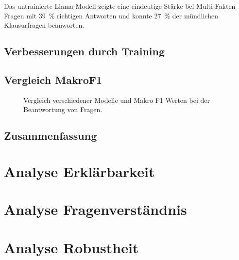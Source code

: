 Das untrainierte Llama Modell zeigte eine eindeutige Stärke bei Multi-Fakten Fragen mit \SI{39}{\percent} richtigen Antworten und konnte \SI{27}{\percent} der mündlichen Klausurfragen beanworten. 
\subsection{Verbesserungen durch Training}
\subsection{Vergleich MakroF1}
\begin{figure}
    \caption{Vergleich verschiedener Modelle und Makro F1 Werten bei der Beantwortung von Fragen.}
    \label{fig:results:makro_total}
\end{figure}
\subsection{Zusammenfassung}
\section{Analyse Erklärbarkeit}\label{sec:results:explainability}
\section{Analyse Fragenverständnis}\label{sec:results:questionunderstanding}
\section{Analyse Robustheit}\label{sec:results:robustness}
